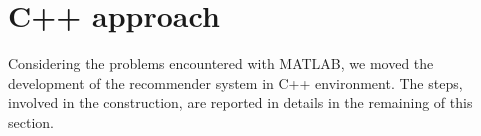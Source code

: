 \section{C++ approach}

Considering the problems encountered with MATLAB, we moved the development of the recommender system in C++ environment. The steps, involved in the construction, are reported in details in the remaining of this section.



